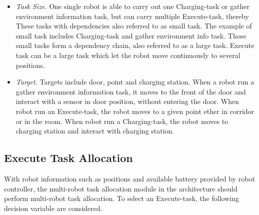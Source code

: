 \begin{table}[htb]
\centering
{}
\caption{Task attributes part 2}
\label{tab:task_attributes_common}
\end{table}


\begin{table}[htb]
\centering
{}
\caption{Task Table in Database}
\label{tab:task_table}
\end{table}

\begin{itemize}
	\item \textsl{Task Size.} One single robot is able to carry out one Charging-task or gather environment information task, but can carry multiple Execute-task, thereby 
	These tasks with dependencies also referred to as small task. The example of small task includes Charging-task and gather environment info task. 
	Those small tasks form a dependency chain, also referred to as a large task. Execute task can be a large task which let the robot move continuously to several positions.
	\item \textsl{Target.} Targets include door, point and charging station. When a robot run a gather environment information task, it moves to the front of the door and interact with a sensor in door position, without entering the door. 
	When robot run an Execute-task, the robot moves to a given point ether in corridor or in the room.
	When robot run a Charging-task, the robot moves to charging station and interact with charging station.
\end{itemize}

\subsection{Execute Task Allocation}
With robot information such as positions and available battery provided by robot controller, the multi-robot task allocation module in the architecture should perform multi-robot task allocation. To select an Execute-task, the following decision variable are considered.
